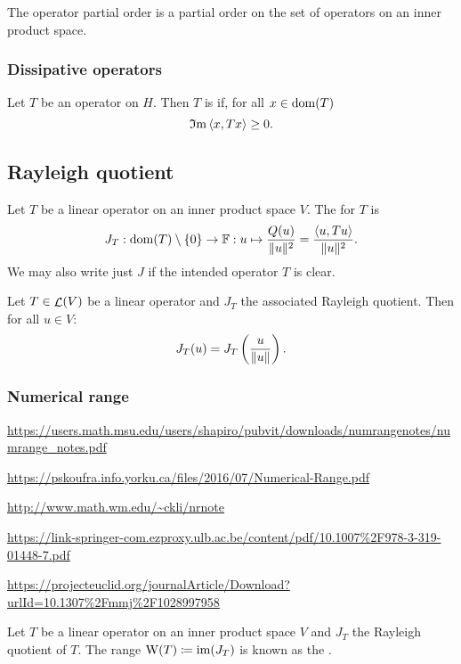 \begin{lemma}
The operator partial order is a partial order on the set of operators on an inner product space.
\end{lemma}

\subsubsection{Dissipative operators}
\begin{definition}
Let $T$ be an operator on $H$. Then $T$ is  if, for all $x\in\operatorname{dom}(T)$
\[ \operatorname{\mathfrak{I}m} \left\langle x,Tx \right\rangle \geq 0. \]
\end{definition}

\subsection{Rayleigh quotient}
\begin{definition}
Let $T$ be a linear operator on an inner product space $V$. The  for $T$ is 
\[ J_T: \operatorname{dom}(T)\setminus\{0\}\to \mathbb{F}: u\mapsto \frac{Q(u)}{\lVert u\rVert^2} = \frac{\left\langle u,Tu \right\rangle}{\lVert u\rVert^2}. \]
We may also write just $J$ if the intended operator $T$ is clear.
\end{definition}

\begin{lemma}
Let $T\in\mathop{\mathcal{L}}(V)$ be a linear operator and $J_T$ the associated Rayleigh quotient. Then for all $u\in V$:
\[ J_T(u) = J_T\left(\frac{u}{\lVert u\rVert}\right). \]
\end{lemma}

\subsubsection{Numerical range}
\url{https://users.math.msu.edu/users/shapiro/pubvit/downloads/numrangenotes/numrange_notes.pdf}

\url{https://pskoufra.info.yorku.ca/files/2016/07/Numerical-Range.pdf}

\url{http://www.math.wm.edu/~ckli/nrnote}

\url{https://link-springer-com.ezproxy.ulb.ac.be/content/pdf/10.1007%2F978-3-319-01448-7.pdf}

\url{https://projecteuclid.org/journalArticle/Download?urlId=10.1307%2Fmmj%2F1028997958}

\begin{definition}
Let $T$ be a linear operator on an inner product space $V$ and $J_T$ the Rayleigh quotient of $T$. The range $\operatorname{W}(T) \coloneqq \operatorname{im}(J_T)$ is known as the .
\end{definition}

